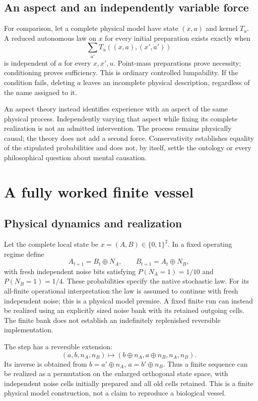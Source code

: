 \section{An aspect and an independently variable force}\label{section:completion:an-extra-awareness-variable-versus-an-aspect}
For comparison, let a complete physical model have state $(x,a)$ and kernel $T_u$. A reduced autonomous law on $x$ for every initial preparation exists exactly when
\[
\sum_{a'}T_u((x,a),(x',a'))
\]
is independent of $a$ for every $x,x',u$. Point-mass preparations prove necessity; conditioning proves sufficiency. This is ordinary controlled lumpability. If the condition fails, deleting $a$ leaves an incomplete physical description, regardless of the name assigned to it.

An aspect theory instead identifies experience with an aspect of the same physical process. Independently varying that aspect while fixing its complete realization is not an admitted intervention. The process remains physically causal; the theory does not add a second force. Conservativity establishes equality of the stipulated probabilities and does not, by itself, settle the ontology or every philosophical question about mental causation.

\chapter{A fully worked finite vessel}\label{ch:worked}
\section{Physical dynamics and realization}\label{section:worked:physical-dynamics-and-realization}
Let the complete local state be $x=(A,B)\in\{0,1\}^2$. In a fixed operating regime define
\begin{equation}\label{eq:twobit}
A_{t+1}=B_t\oplus N_A,\qquad
B_{t+1}=A_t\oplus N_B,
\end{equation}
with fresh independent noise bits satisfying $P(N_A=1)=1/10$ and $P(N_B=1)=1/4$. These probabilities specify the native stochastic law. For its all-finite operational interpretation the law is assumed to continue with fresh independent noise; this is a physical model premise. A fixed finite run can instead be realized using an explicitly sized noise bank with its retained outgoing cells. The finite bank does not establish an indefinitely replenished reversible implementation.

The step has a reversible extension:
\[
(a,b,n_A,n_B)\longmapsto(b\oplus n_A,a\oplus n_B,n_A,n_B).
\]
Its inverse is obtained from $b=a'\oplus n_A$, $a=b'\oplus n_B$. Thus a finite sequence can be realized as a permutation on the enlarged orthogonal state space, with independent noise cells initially prepared and all old cells retained. This is a finite physical model construction, not a claim to reproduce a biological vessel.

